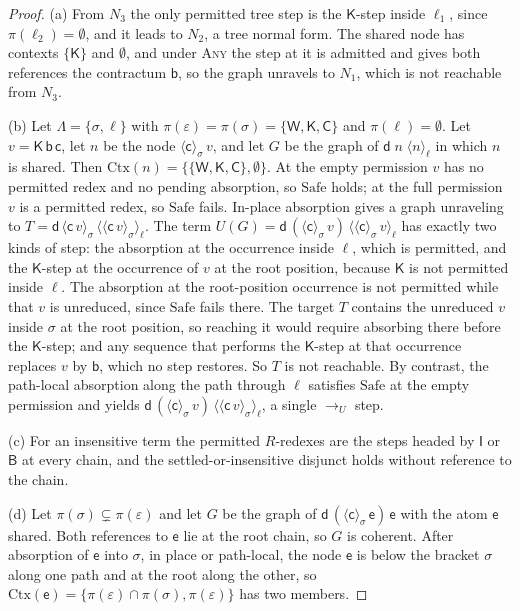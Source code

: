 \documentclass[11pt]{article}
\theoremstyle{definition}
\theoremstyle{remark}
\newcommand{\cI}{\mathsf{I}}
\newcommand{\cB}{\mathsf{B}}
\newcommand{\cC}{\mathsf{C}}
\newcommand{\cK}{\mathsf{K}}
\newcommand{\cW}{\mathsf{W}}
\newcommand{\br}[2]{\langle #1\rangle_{#2}}
\newcommand{\Ctx}{\mathrm{Ctx}}
\begin{document}
\begin{proof}
(a) From $N_3$ the only permitted tree step is the $\cK$-step inside $\ell_1$, since $\pi(\ell_2)=\emptyset$, and it leads to $N_2$, a tree normal form. The shared node has contexts $\{\cK\}$ and $\emptyset$, and under \textsc{Any} the step at it is admitted and gives both references the contractum $\mathsf b$, so the graph unravels to $N_1$, which is not reachable from $N_3$.

(b) Let $\Lambda=\{\sigma,\ell\}$ with $\pi(\varepsilon)=\pi(\sigma)=\{\cW,\cK,\cC\}$ and $\pi(\ell)=\emptyset$. Let $v=\cK\,\mathsf b\,\mathsf c$, let $n$ be the node $\br{\mathsf c}\sigma\,v$, and let $G$ be the graph of $\mathsf d\;n\;\br n\ell$ in which $n$ is shared. Then $\Ctx(n)=\{\{\cW,\cK,\cC\},\emptyset\}$. At the empty permission $v$ has no permitted redex and no pending absorption, so $\mathrm{Safe}$ holds; at the full permission $v$ is a permitted redex, so $\mathrm{Safe}$ fails. In-place absorption gives a graph unraveling to $T=\mathsf d\,\br{\mathsf c\,v}\sigma\,\br{\br{\mathsf c\,v}\sigma}\ell$. The term $U(G)=\mathsf d\,(\br{\mathsf c}\sigma\,v)\,\br{\br{\mathsf c}\sigma\,v}\ell$ has exactly two kinds of step: the absorption at the occurrence inside $\ell$, which is permitted, and the $\cK$-step at the occurrence of $v$ at the root position, because $\cK$ is not permitted inside $\ell$. The absorption at the root-position occurrence is not permitted while that $v$ is unreduced, since $\mathrm{Safe}$ fails there. The target $T$ contains the unreduced $v$ inside $\sigma$ at the root position, so reaching it would require absorbing there before the $\cK$-step; and any sequence that performs the $\cK$-step at that occurrence replaces $v$ by $\mathsf b$, which no step restores. So $T$ is not reachable. By contrast, the path-local absorption along the path through $\ell$ satisfies $\mathrm{Safe}$ at the empty permission and yields $\mathsf d\,(\br{\mathsf c}\sigma\,v)\,\br{\br{\mathsf c\,v}\sigma}\ell$, a single $\to_U$ step.

(c) For an insensitive term the permitted $R$-redexes are the steps headed by $\cI$ or $\cB$ at every chain, and the settled-or-insensitive disjunct holds without reference to the chain.

(d) Let $\pi(\sigma)\subsetneq\pi(\varepsilon)$ and let $G$ be the graph of $\mathsf d\,(\br{\mathsf c}\sigma\,\mathsf e)\,\mathsf e$ with the atom $\mathsf e$ shared. Both references to $\mathsf e$ lie at the root chain, so $G$ is coherent. After absorption of $\mathsf e$ into $\sigma$, in place or path-local, the node $\mathsf e$ is below the bracket $\sigma$ along one path and at the root along the other, so $\Ctx(\mathsf e)=\{\pi(\varepsilon)\cap\pi(\sigma),\pi(\varepsilon)\}$ has two members.
\end{proof}
\end{document}
